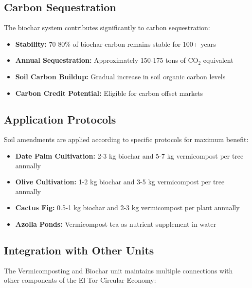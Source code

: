 \subsection{Carbon Sequestration}

The biochar system contributes significantly to carbon sequestration:

\begin{itemize}
    \item \textbf{Stability:} 70-80\% of biochar carbon remains stable for 100+ years
    \item \textbf{Annual Sequestration:} Approximately 150-175 tons of CO$_2$ equivalent
    \item \textbf{Soil Carbon Buildup:} Gradual increase in soil organic carbon levels
    \item \textbf{Carbon Credit Potential:} Eligible for carbon offset markets
\end{itemize}

\subsection{Application Protocols}

Soil amendments are applied according to specific protocols for maximum benefit:

\begin{itemize}
    \item \textbf{Date Palm Cultivation:} 2-3 kg biochar and 5-7 kg vermicompost per tree annually
    \item \textbf{Olive Cultivation:} 1-2 kg biochar and 3-5 kg vermicompost per tree annually
    \item \textbf{Cactus Fig:} 0.5-1 kg biochar and 2-3 kg vermicompost per plant annually
    \item \textbf{Azolla Ponds:} Vermicompost tea as nutrient supplement in water
\end{itemize}

\subsection{Integration with Other Units}

The Vermicomposting and Biochar unit maintains multiple connections with other components of the El Tor Circular Economy:

